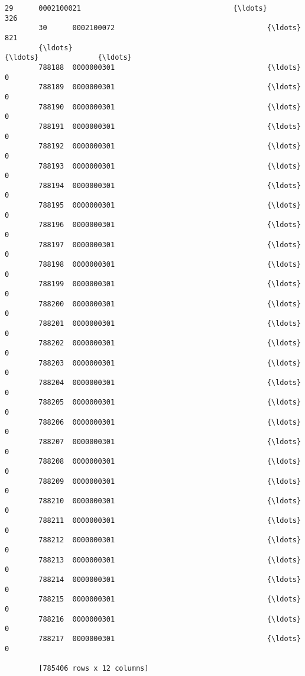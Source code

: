 \documentclass[11pt]{article}
\begin{document}
\begin{Verbatim}[commandchars=\\\{\}]
        29      0002100021                                    {\ldots}              326  
        30      0002100072                                    {\ldots}              821  
        {\ldots}                                                   {\ldots}              {\ldots}  
        788188  0000000301                                    {\ldots}                0  
        788189  0000000301                                    {\ldots}                0  
        788190  0000000301                                    {\ldots}                0  
        788191  0000000301                                    {\ldots}                0  
        788192  0000000301                                    {\ldots}                0  
        788193  0000000301                                    {\ldots}                0  
        788194  0000000301                                    {\ldots}                0  
        788195  0000000301                                    {\ldots}                0  
        788196  0000000301                                    {\ldots}                0  
        788197  0000000301                                    {\ldots}                0  
        788198  0000000301                                    {\ldots}                0  
        788199  0000000301                                    {\ldots}                0  
        788200  0000000301                                    {\ldots}                0  
        788201  0000000301                                    {\ldots}                0  
        788202  0000000301                                    {\ldots}                0  
        788203  0000000301                                    {\ldots}                0  
        788204  0000000301                                    {\ldots}                0  
        788205  0000000301                                    {\ldots}                0  
        788206  0000000301                                    {\ldots}                0  
        788207  0000000301                                    {\ldots}                0  
        788208  0000000301                                    {\ldots}                0  
        788209  0000000301                                    {\ldots}                0  
        788210  0000000301                                    {\ldots}                0  
        788211  0000000301                                    {\ldots}                0  
        788212  0000000301                                    {\ldots}                0  
        788213  0000000301                                    {\ldots}                0  
        788214  0000000301                                    {\ldots}                0  
        788215  0000000301                                    {\ldots}                0  
        788216  0000000301                                    {\ldots}                0  
        788217  0000000301                                    {\ldots}                0  
        
        [785406 rows x 12 columns]
\end{Verbatim}
            
\end{document}
